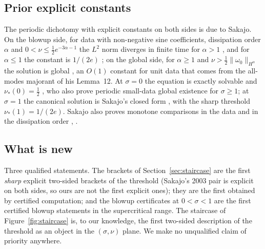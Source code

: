\documentclass[11pt,a4paper]{article}
\theoremstyle{plain}
\theoremstyle{definition}
\newcommand{\nrm}[1]{\lVert #1 \rVert}
\begin{document}
\subsection{Prior explicit constants}
The periodic dichotomy with explicit constants on both sides is due to Sakajo. On the blowup side, for data with non-negative sine coefficients, dissipation order $\alpha$ and $0<\nu\le\tfrac12e^{-3\alpha-1}$ the $L^2$ norm diverges in finite time for $\alpha>1$ \cite[Theorem~5]{Sak03b}, and for $\alpha\le1$ the constant is $1/(2e)$ \cite[Theorems~4 and~9]{Sak03b}; on the global side, for $\alpha\ge1$ and $\nu>\tfrac12\nrm{\omega_0}_{H^\alpha}$ the solution is global \cite[Theorem~14, as stated in the author's survey]{Sak03c}, an $O(1)$ constant for unit data that comes from the all-modes majorant of his Lemma~12. At $\sigma=0$ the equation is exactly solvable and $\nu_*(0)=\tfrac12$ \cite{ALSS24}, who also prove periodic small-data global existence for $\sigma\ge1$; at $\sigma=1$ the canonical solution is Sakajo's closed form \cite[Lemma~3]{Sak03b}, with the sharp threshold $\nu_*(1)=1/(2e)$. Sakajo also proves monotone comparisons in the data and in the dissipation order \cite[Proposition~2]{Sak03b}, \cite[Proposition~1]{Sak03c}.

\subsection{What is new}
Three qualified statements. The brackets of Section~\ref{sec:staircase} are the first \emph{sharp} explicit two-sided brackets of the threshold (Sakajo's 2003 pair is explicit on both sides, so ours are not the first explicit ones); they are the first obtained by certified computation; and the blowup certificates at $0<\sigma<1$ are the first certified blowup statements in the supercritical range. The staircase of Figure~\ref{fig:staircase} is, to our knowledge, the first two-sided description of the threshold as an object in the $(\sigma,\nu)$ plane. We make no unqualified claim of priority anywhere.
\end{document}
